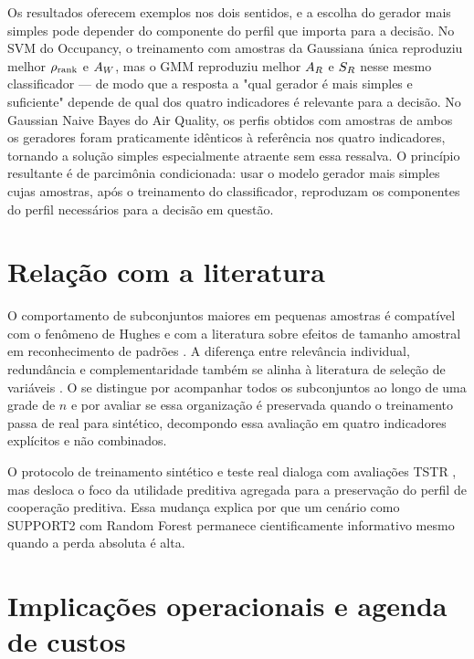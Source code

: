 Os resultados oferecem exemplos nos dois sentidos, e a escolha do gerador mais simples pode depender do componente do perfil que importa para a decisão. No SVM do Occupancy, o treinamento com amostras da Gaussiana única reproduziu melhor $\rho_{\mathrm{rank}}$ e $A_W$, mas o GMM reproduziu melhor $A_R$ e $S_R$ nesse mesmo classificador --- de modo que a resposta a "qual gerador é mais simples e suficiente" depende de qual dos quatro indicadores é relevante para a decisão. No Gaussian Naive Bayes do Air Quality, os perfis obtidos com amostras de ambos os geradores foram praticamente idênticos à referência nos quatro indicadores, tornando a solução simples especialmente atraente sem essa ressalva. O princípio resultante é de parcimônia condicionada: usar o modelo gerador mais simples cujas amostras, após o treinamento do classificador, reproduzam os componentes do perfil necessários para a decisão em questão.

\section{Relação com a literatura}

O comportamento de subconjuntos maiores em pequenas amostras é compatível com o fenômeno de Hughes e com a literatura sobre efeitos de tamanho amostral em reconhecimento de padrões \cite{hughes1968,raudys1991}. A diferença entre relevância individual, redundância e complementaridade também se alinha à literatura de seleção de variáveis \cite{guyon2003,brown2012}. O \CoInfoSim{} se distingue por acompanhar todos os subconjuntos ao longo de uma grade de $n$ e por avaliar se essa organização é preservada quando o treinamento passa de real para sintético, decompondo essa avaliação em quatro indicadores explícitos e não combinados.

O protocolo de treinamento sintético e teste real dialoga com avaliações TSTR \cite{esteban2017}, mas desloca o foco da utilidade preditiva agregada para a preservação do perfil de cooperação preditiva. Essa mudança explica por que um cenário como SUPPORT2 com Random Forest permanece cientificamente informativo mesmo quando a perda absoluta é alta.

\section{Implicações operacionais e agenda de custos}

